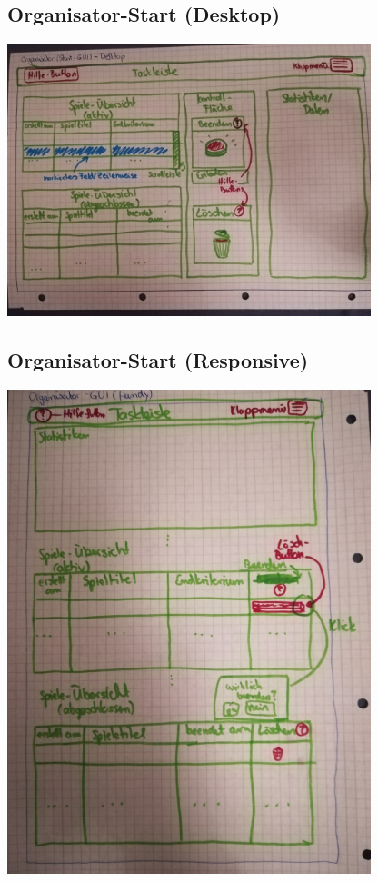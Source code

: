 \documentclass[a4paper]{scrreprt}
\begin{document}
    \subsection{Organisator-Start (Desktop)}
    \centering
    \includegraphics[width=400px]{../pictures/2_Organisator.jpg}
    \subsection{Organisator-Start (Responsive)}
    \centering
    \includegraphics[width=400px]{../pictures/3_Organisator(responsive).jpg}
\end{document}
